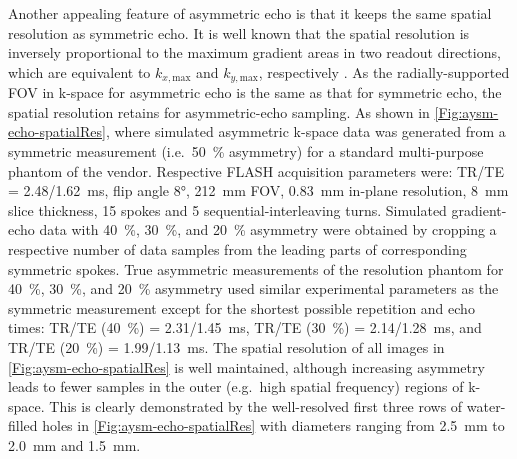Another appealing feature of asymmetric echo is that it keeps the same spatial resolution as symmetric echo. It is well known that the spatial resolution is inversely proportional to the maximum gradient areas in two readout directions, which are equivalent to $k_{x,\text{max}}$ and $k_{y,\text{max}}$, respectively \cite{2010_principle_mri}. As the radially-supported FOV in k-space for asymmetric echo is the same as that for symmetric echo, the spatial resolution retains for asymmetric-echo sampling. As shown in \cref{Fig:aysm-echo-spatialRes}, where simulated asymmetric k-space data was generated from a symmetric measurement (i.e.~\SI{50}{\percent} asymmetry) for a standard multi-purpose phantom of the vendor. Respective FLASH acquisition parameters were: TR/TE = \num{2.48}/\SI{1.62}{\ms}, flip angle \ang{8}, \SI{212}{\mm} FOV, \SI{0.83}{\mm} in-plane resolution, \SI{8}{\mm} slice thickness, \num{15} spokes and \num{5} sequential-interleaving turns. Simulated gradient-echo data with \SI{40}{\percent}, \SI{30}{\percent}, and \SI{20}{\percent} asymmetry were obtained by cropping a respective number of data samples from the leading parts of corresponding symmetric spokes. True asymmetric measurements of the resolution phantom for \SI{40}{\percent}, \SI{30}{\percent}, and \SI{20}{\percent} asymmetry used similar experimental parameters as the symmetric measurement except for the shortest possible repetition and echo times: TR/TE (\SI{40}{\percent}) = \num{2.31}/\SI{1.45}{\ms}, TR/TE (\SI{30}{\percent}) = \num{2.14}/\SI{1.28}{\ms}, and TR/TE (\SI{20}{\percent}) = \num{1.99}/\SI{1.13}{\ms}. The spatial resolution of all images in \cref{Fig:aysm-echo-spatialRes} is well maintained, although increasing asymmetry leads to fewer samples in the outer (e.g.~high spatial frequency) regions of k-space. This is clearly demonstrated by the well-resolved first three rows of water-filled holes in \cref{Fig:aysm-echo-spatialRes} with diameters ranging from \SI{2.5}{\mm} to \SI{2.0}{\mm} and \SI{1.5}{\mm}.
